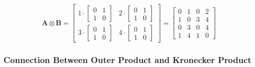 \documentclass[
  letterpaper,
  DIV=11,
  numbers=noendperiod]{scrreprt}
\theoremstyle{plain}
\theoremstyle{definition}
\theoremstyle{remark}
\begin{document}
\[
\mathbf{A} \otimes \mathbf{B} = \begin{bmatrix}
1 \cdot \begin{bmatrix}0&1\\1&0\end{bmatrix} & 2 \cdot \begin{bmatrix}0&1\\1&0\end{bmatrix} \\
3 \cdot \begin{bmatrix}0&1\\1&0\end{bmatrix} & 4 \cdot \begin{bmatrix}0&1\\1&0\end{bmatrix}
\end{bmatrix} = \begin{bmatrix}
0 & 1 & 0 & 2 \\
1 & 0 & 3 & 4 \\
0 & 3 & 0 & 4 \\
1 & 4 & 1 & 0
\end{bmatrix}
\]

\subsubsection{Connection Between Outer Product and Kronecker
Product}\label{connection-between-outer-product-and-kronecker-product-1}
\end{document}
